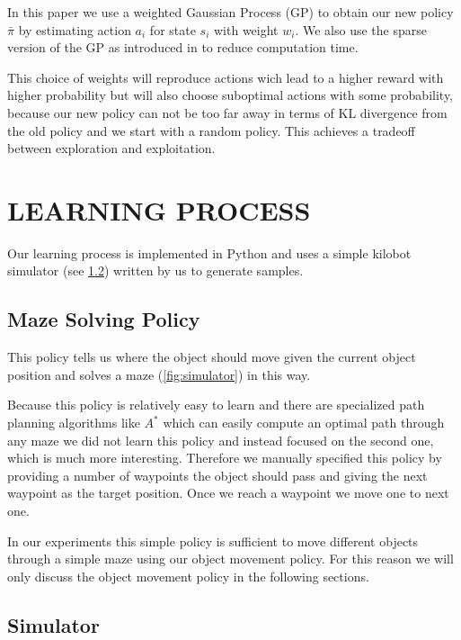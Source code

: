 \documentclass[twoside]{article}
\begin{document}
In this paper we use a weighted Gaussian Process (GP) to obtain our new policy
$\bar{\pi}$ by estimating action $a_i$ for state $s_i$ with weight $w_i$. We
also use the sparse version of the GP as introduced in \cite{sparsegp} to reduce
computation time.

This choice of weights will reproduce actions wich lead to a higher reward with
higher probability but will also choose suboptimal actions with some
probability, because our new policy can not be too far away in terms of KL
divergence from the old policy and we start with a random policy. This achieves
a tradeoff between exploration and exploitation.

\section{LEARNING PROCESS}

Our learning process is implemented in Python and uses a simple kilobot
simulator (see \ref{sec:simulator}) written by us to generate samples.

\subsection{Maze Solving Policy}
This policy tells us where the object should move given the current object
position and solves a maze (\autoref{fig:simulator}) in this way.

Because this policy is relatively easy to learn and there are specialized path
planning algorithms like $A^*$ which can easily compute an optimal path through
any maze we did not learn this policy and instead focused on the second one,
which is much more interesting. Therefore we manually specified this policy by
providing a number of waypoints the object should pass and giving the next
waypoint as the target position. Once we reach a waypoint we move one to next
one.

In our experiments this simple policy is sufficient to move different objects
through a simple maze using our object movement policy. For this reason we will
only discuss the object movement policy in the following sections.

\subsection{Simulator}
\label{sec:simulator}

\newcommand\nkb{\#\mathit{kb}}
\newcommand\nep{\#\mathit{ep}}
\newcommand\nst{\#\mathit{st}}
\end{document}

